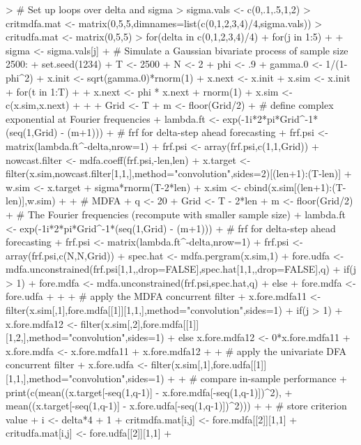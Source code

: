 \documentclass[a4paper]{book}
\begin{document}
\begin{Schunk}
\begin{Sinput}
> # Set up loops over delta and sigma
> sigma.vals <- c(0,.1,.5,1,2)
> critmdfa.mat <- matrix(0,5,5,dimnames=list(c(0,1,2,3,4)/4,sigma.vals))
> critudfa.mat <- matrix(0,5,5)
> for(delta in c(0,1,2,3,4)/4) {
+ for(j in 1:5) {
+ 
+ sigma <- sigma.vals[j]
+ # Simulate a Gaussian bivariate process of sample size 2500:
+ set.seed(1234)
+ T <- 2500
+ N <- 2
+ phi <- .9
+ gamma.0 <- 1/(1-phi^2)
+ x.init <- sqrt(gamma.0)*rnorm(1)
+ x.next <- x.init
+ x.sim <- x.init
+ for(t in 1:T)
+ {
+ 	x.next <- phi * x.next + rnorm(1)
+ 	x.sim <- c(x.sim,x.next)
+ }
+ 
+ Grid <- T
+ m <- floor(Grid/2)
+ # define complex exponential at Fourier frequencies
+ lambda.ft <- exp(-1i*2*pi*Grid^{-1}*(seq(1,Grid) - (m+1)))
+ # frf for delta-step ahead forecasting
+ frf.psi <- matrix(lambda.ft^{-delta},nrow=1) 
+ frf.psi <- array(frf.psi,c(1,1,Grid))
+ nowcast.filter <- mdfa.coeff(frf.psi,-len,len)
+ x.target <- filter(x.sim,nowcast.filter[1,1,],method="convolution",sides=2)[(len+1):(T-len)]
+ w.sim <- x.target + sigma*rnorm(T-2*len)
+ x.sim <- cbind(x.sim[(len+1):(T-len)],w.sim)
+ 
+ # MDFA
+ q <- 20
+ Grid <- T - 2*len
+ m <- floor(Grid/2)
+ # The Fourier frequencies (recompute with smaller sample size)
+ lambda.ft <- exp(-1i*2*pi*Grid^{-1}*(seq(1,Grid) - (m+1)))
+ # frf for delta-step ahead forecasting
+ frf.psi <- matrix(lambda.ft^{-delta},nrow=1) %
+ frf.psi <- array(frf.psi,c(N,N,Grid))
+ spec.hat <- mdfa.pergram(x.sim,1)	
+ fore.udfa <- mdfa.unconstrained(frf.psi[1,1,,drop=FALSE],spec.hat[1,1,,drop=FALSE],q)
+ if(j > 1) { 
+ 	fore.mdfa <- mdfa.unconstrained(frf.psi,spec.hat,q) 
+ } else {
+ 	fore.mdfa <- fore.udfa 
+ }
+   
+ # apply the MDFA concurrent filter
+ x.fore.mdfa11 <- filter(x.sim[,1],fore.mdfa[[1]][1,1,],method="convolution",sides=1)
+ if(j > 1) { 
+ 	x.fore.mdfa12 <- filter(x.sim[,2],fore.mdfa[[1]][1,2,],method="convolution",sides=1) 
+ } else { x.fore.mdfa12 <- 0*x.fore.mdfa11 }
+ x.fore.mdfa <- x.fore.mdfa11 + x.fore.mdfa12 
+ 
+ # apply the univariate DFA concurrent filter
+ x.fore.udfa <- filter(x.sim[,1],fore.udfa[[1]][1,1,],method="convolution",sides=1)
+ 
+ # compare in-sample performance
+ print(c(mean((x.target[-seq(1,q-1)] - x.fore.mdfa[-seq(1,q-1)])^2),
+ 	mean((x.target[-seq(1,q-1)] - x.fore.udfa[-seq(1,q-1)])^2)))
+ 
+ # store criterion value
+ i <- delta*4 + 1
+ critmdfa.mat[i,j] <- fore.mdfa[[2]][1,1]
+ critudfa.mat[i,j] <- fore.udfa[[2]][1,1]
+ }}
\end{Sinput}
\begin{Soutput}

\end{Soutput}
\end{Schunk}
\end{document}
